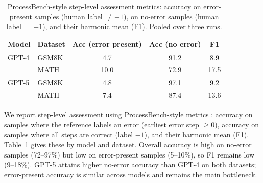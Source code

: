 

\begin{table}[t]
\centering
\caption{ProcessBench-style step-level assessment metrics: accuracy on error-present samples (human label $\neq -1$), on no-error samples (human label $= -1$), and their harmonic mean (F1). Pooled over three runs.}
\label{tab:processbench-metrics}
\begin{tabular}{llccc}
\toprule
Model & Dataset & Acc (error present) & Acc (no error) & F1 \\
\midrule
GPT-4  & GSM8K & 4.7 & 91.2 & 8.9 \\
       & MATH  & 10.0 & 72.9 & 17.5 \\
GPT-5  & GSM8K & 4.8 & 97.1 & 9.2 \\
       & MATH  & 7.4 & 87.4 & 13.6 \\
\bottomrule
\end{tabular}
\end{table}

We report step-level assessment using ProcessBench-style metrics \cite{processbench}: accuracy on samples where the reference labels an error (earliest error step $\geq 0$), accuracy on samples where all steps are correct (label $-1$), and their harmonic mean (F1). Table~\ref{tab:processbench-metrics} gives these by model and dataset. Overall accuracy is high on no-error samples (72--97\%) but low on error-present samples (5--10\%), so F1 remains low (9--18\%). GPT-5 attains higher no-error accuracy than GPT-4 on both datasets; error-present accuracy is similar across models and remains the main bottleneck.

